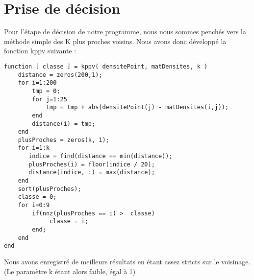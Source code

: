\section{Prise de décision}

Pour l'étape de décision de notre programme, nous nous sommes penchés vers la méthode simple des K plus proches voisins. Nous avons donc développé la 
fonction kppv suivante :
\\
\begin{lstlisting}
function [ classe ] = kppv( densitePoint, matDensites, k )
    distance = zeros(200,1);
    for i=1:200
        tmp = 0;
        for j=1:25
            tmp = tmp + abs(densitePoint(j) - matDensites(i,j));
        end
        distance(i) = tmp;
    end
    plusProches = zeros(k, 1);
    for i=1:k
       indice = find(distance == min(distance));
       plusProches(i) = floor(indice / 20);
       distance(indice, :) = max(distance);
    end
    sort(plusProches);
    classe = 0;
    for i=0:9
        if(nnz(plusProches == i) >  classe)
             classe = i;
        end;
    end
end
\end{lstlisting}


Nous avons enregistré de meilleurs résultats en étant assez stricts sur le voisinage. (Le paramètre k étant alors faible, égal à 1)